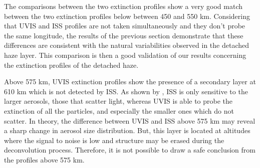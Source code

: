 The comparisons between the two extinction profiles show a very good match between the two extinction profiles below
between 450 and 550 km. Considering that UVIS and ISS profiles are not taken simultaneously and
they don't probe the same longitude, the results of the previous section demonstrate that these differences are
consistent with the natural variabilities observed in the detached haze layer.
This comparison is then a good validation of our results concerning the extinction profiles of the detached haze.

Above 575 km, UVIS extinction profiles show the presence of a secondary layer at 610 km which is not detected
by ISS. As shown by \cite{Cours2011}, ISS is only sensitive to the larger aerosols, those that scatter light, whereas
UVIS is able to probe the extinction of all the particles, and especially the smaller ones which do not scatter.
In theory, the difference between UVIS and ISS above 575 km may reveal a sharp change in aerosol size distribution.
But, this layer is located at altitudes where the signal to noise is low and structure may be erased during the
deconvolution process. Therefore, it is not possible to draw a safe conclusion from the profiles above 575 km.
